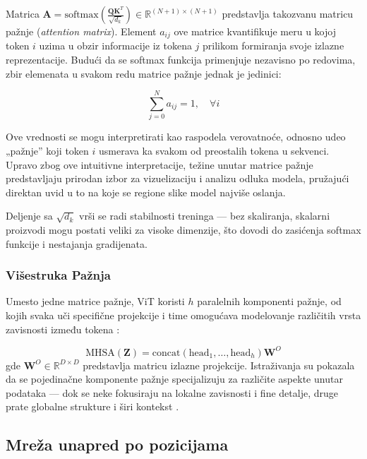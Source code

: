 Matrica $\mathbf{A} = \text{softmax}\left(\frac{\mathbf{Q}\mathbf{K}^T}{\sqrt{d_k}}\right) \in \mathbb{R}^{(N+1) \times (N+1)}$ predstavlja takozvanu matricu pažnje (\textit{attention matrix}). Element $a_{ij}$ ove matrice kvantifikuje meru u kojoj token $i$ uzima u obzir informacije iz tokena $j$ prilikom formiranja svoje izlazne reprezentacije. Budući da se softmax funkcija primenjuje nezavisno po redovima, zbir elemenata u svakom redu matrice pažnje jednak je jedinici:

\begin{equation}
    \sum_{j=0}^{N} a_{ij} = 1, \quad \forall i
\end{equation}

Ove vrednosti se mogu interpretirati kao raspodela verovatnoće, odnosno udeo „pažnje” koji token $i$ usmerava ka svakom od preostalih tokena u sekvenci. Upravo zbog ove intuitivne interpretacije, težine unutar matrice pažnje predstavljaju prirodan izbor za vizuelizaciju i analizu odluka modela, pružajući direktan uvid u to na koje se regione slike model najviše oslanja.

Deljenje sa $\sqrt{d_k}$ vrši se radi stabilnosti treninga — bez skaliranja, 
skalarni proizvodi mogu postati veliki za visoke dimenzije, što dovodi do zasićenja 
softmax funkcije i nestajanja gradijenata.

\subsubsection{Višestruka Pažnja}

Umesto jedne matrice pažnje, ViT koristi $h$ paralelnih komponenti pažnje, od kojih svaka uči specifične projekcije i time omogućava modelovanje različitih vrsta zavisnosti između tokena \cite{voita2019analyzing}:

\begin{equation}
    \text{MHSA}(\mathbf{Z}) = \text{concat}(\text{head}_1, \ldots, \text{head}_h)\mathbf{W}^O
\end{equation}
gde $\mathbf{W}^O \in \mathbb{R}^{D \times D}$ predstavlja matricu izlazne projekcije. Istraživanja su pokazala da se pojedinačne komponente pažnje specijalizuju za različite aspekte unutar podataka — dok se neke fokusiraju na lokalne zavisnosti i fine detalje, druge prate globalne strukture i širi kontekst \cite{voita2019analyzing}.

\subsection{Mreža unapred po pozicijama}

